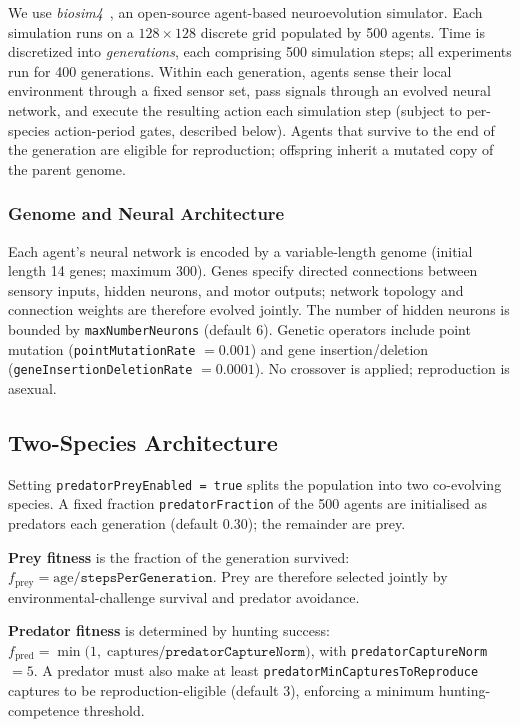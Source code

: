 \documentclass[11pt]{article}
\begin{document}
We use \textit{biosim4}~\cite{biosim4}, an open-source agent-based neuroevolution simulator.
Each simulation runs on a $128 \times 128$ discrete grid populated by 500 agents.
Time is discretized into \emph{generations}, each comprising 500 simulation steps; all
experiments run for 400 generations.
Within each generation, agents sense their local environment through a fixed sensor set, pass
signals through an evolved neural network, and execute the resulting action each simulation
step (subject to per-species action-period gates, described below).
Agents that survive to the end of the generation are eligible for reproduction; offspring
inherit a mutated copy of the parent genome.

\subsubsection{Genome and Neural Architecture}

Each agent's neural network is encoded by a variable-length genome (initial length 14 genes;
maximum 300).
Genes specify directed connections between sensory inputs, hidden neurons, and motor outputs;
network topology and connection weights are therefore evolved jointly.
The number of hidden neurons is bounded by \texttt{maxNumberNeurons} (default 6).
Genetic operators include point mutation (\texttt{pointMutationRate} $= 0.001$) and gene
insertion/deletion (\texttt{geneInsertionDeletionRate} $= 0.0001$).
No crossover is applied; reproduction is asexual.

\subsection{Two-Species Architecture}

Setting \texttt{predatorPreyEnabled = true} splits the population into two co-evolving
species.
A fixed fraction \texttt{predatorFraction} of the 500 agents are initialised as predators each
generation (default 0.30); the remainder are prey.

\textbf{Prey fitness} is the fraction of the generation survived:
$f_{\mathrm{prey}} = \text{age} / \texttt{stepsPerGeneration}$.
Prey are therefore selected jointly by environmental-challenge survival and predator avoidance.

\textbf{Predator fitness} is determined by hunting success:
$f_{\mathrm{pred}} = \min\!\bigl(1,\; \text{captures} / \texttt{predatorCaptureNorm}\bigr)$,
with \texttt{predatorCaptureNorm} $= 5$.
A predator must also make at least \texttt{predatorMinCapturesToReproduce} captures to be
reproduction-eligible (default 3), enforcing a minimum hunting-competence threshold.
\end{document}
